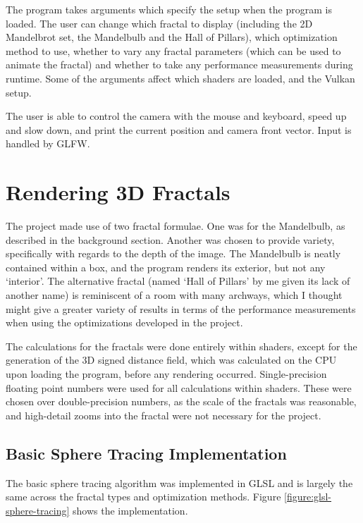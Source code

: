 The program takes arguments which specify the setup when the program is loaded. The user can change which fractal to display (including the 2D Mandelbrot set, the Mandelbulb and the Hall of Pillars), which optimization method to use, whether to vary any fractal parameters (which can be used to animate the fractal) and whether to take any performance measurements during runtime. Some of the arguments affect which shaders are loaded, and the Vulkan setup.\newline

The user is able to control the camera with the mouse and keyboard, speed up and slow down, and print the current position and camera front vector. Input is handled by GLFW.

\section{Rendering 3D Fractals}

The project made use of two fractal formulae. One was for the Mandelbulb, as described in the background section. Another was chosen to provide variety, specifically with regards to the depth of the image. The Mandelbulb is neatly contained within a box, and the program renders its exterior, but not any `interior'. The alternative fractal (named `Hall of Pillars' by me given its lack of another name) is reminiscent of a room with many archways, which I thought might give a greater variety of results in terms of the performance measurements when using the optimizations developed in the project.\newline

The calculations for the fractals were done entirely within shaders, except for the generation of the 3D signed distance field, which was calculated on the CPU upon loading the program, before any rendering occurred. Single-precision floating point numbers were used for all calculations within shaders. These were chosen over double-precision numbers, as the scale of the fractals was reasonable, and high-detail zooms into the fractal were not necessary for the project.

\subsection{Basic Sphere Tracing Implementation}

The basic sphere tracing algorithm was implemented in GLSL and is largely the same across the fractal types and optimization methods. Figure \ref{figure:glsl-sphere-tracing} shows the implementation.

